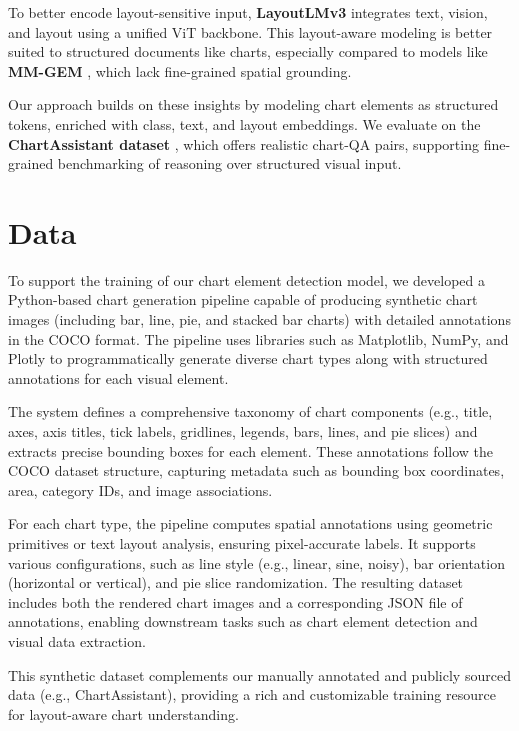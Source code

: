 \documentclass[11pt]{article}
\begin{document}
To better encode layout-sensitive input, \textbf{LayoutLMv3} \cite{huang2023layoutlmv3} integrates text, vision, and layout using a unified ViT backbone. This layout-aware modeling is better suited to structured documents like charts, especially compared to models like \textbf{MM-GEM} \cite{zhang2024mmgem}, which lack fine-grained spatial grounding.

Our approach builds on these insights by modeling chart elements as structured tokens, enriched with class, text, and layout embeddings. We evaluate on the \textbf{ChartAssistant dataset} \cite{chartassistant_dataset}, which offers realistic chart-QA pairs, supporting fine-grained benchmarking of reasoning over structured visual input.



\section{Data}
To support the training of our chart element detection model, we developed a Python-based chart generation pipeline capable of producing synthetic chart images (including bar, line, pie, and stacked bar charts) with detailed annotations in the COCO format. The pipeline uses libraries such as Matplotlib, NumPy, and Plotly to programmatically generate diverse chart types along with structured annotations for each visual element.

The system defines a comprehensive taxonomy of chart components (e.g., title, axes, axis titles, tick labels, gridlines, legends, bars, lines, and pie slices) and extracts precise bounding boxes for each element. These annotations follow the COCO dataset structure, capturing metadata such as bounding box coordinates, area, category IDs, and image associations.

For each chart type, the pipeline computes spatial annotations using geometric primitives or text layout analysis, ensuring pixel-accurate labels. It supports various configurations, such as line style (e.g., linear, sine, noisy), bar orientation (horizontal or vertical), and pie slice randomization. The resulting dataset includes both the rendered chart images and a corresponding JSON file of annotations, enabling downstream tasks such as chart element detection and visual data extraction.

This synthetic dataset complements our manually annotated and publicly sourced data (e.g., ChartAssistant), providing a rich and customizable training resource for layout-aware chart understanding.
\end{document}
